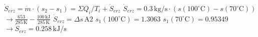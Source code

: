 \( \dot{S}_{erz} = \dot{m} \cdot (s_2 - s_1) = \Sigma Q_i / T_i + \dot{S}_{erz} \)  
\( \dot{S}_{erz} = 0.3 \, \text{kg/s} \cdot (s(100^\circ \text{C}) - s(70^\circ \text{C})) \)  
\( \rightarrow \frac{653}{285 \, \text{K}} - \frac{100 \, \text{kJ}}{285 \, \text{K}} \)  
\( \dot{S}_{erz} = \Delta s \, \text{A2} \)  
\( s_1(100^\circ \text{C}) = 1.3063 \)  
\( s_1(70^\circ \text{C}) = 0.95349 \)  
\( \rightarrow \dot{S}_{erz} = 0.258 \, \text{kJ/s} \)